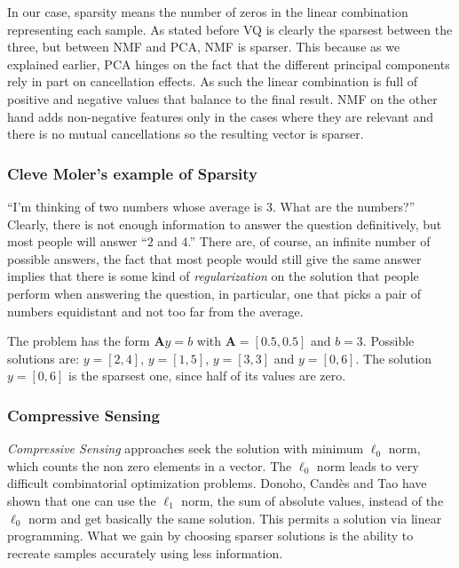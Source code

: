 \documentclass[a4paper]{article}
\begin{document}
In our case, sparsity means the number of zeros in the linear combination representing each sample. As stated before VQ is clearly the sparsest between the three, but between NMF and PCA, NMF is sparser. This because as we explained earlier, PCA hinges on the fact that the different principal components rely in part on cancellation effects. As such the linear combination is full of positive and negative values that balance to the final result. NMF on the other hand adds non-negative features only in the cases where they are relevant and there is no mutual cancellations so the resulting vector is sparser. 

\subsubsection{Cleve Moler's example of Sparsity}
``I'm thinking of two numbers whose average is 3. What are the numbers?''  Clearly, there is not enough information to answer the question definitively, but most people will answer ``$2$ and $4$.'' There are, of course, an infinite number of possible answers, the fact that most people would still give the same answer implies that there is some kind of \textit{regularization} on the solution that people perform when answering the question, in particular, one that picks a pair of numbers equidistant and not too far from the average.

The problem has the form $\mathbf{A}y=b$ with $\mathbf{A}=[0.5,0.5]$ and $b=3$. Possible solutions are: $y=[2,4]$, $y=[1,5]$, $y=[3,3]$ and $y=[0,6]$. The solution $y=[0,6]$ is the sparsest one, since half of its values are zero.

\subsubsection{Compressive Sensing}
\textit{Compressive Sensing} approaches seek the solution with minimum $\ell_0$ norm, which counts the non zero elements in a vector. The $\ell_0$ norm leads to very difficult combinatorial optimization problems. Donoho, Cand\`{e}s and Tao have shown that one can use the $\ell_1$ norm, the sum of absolute values,  instead of the $\ell_0$ norm and get basically the same solution. This permits a solution via linear programming. What we gain by choosing sparser solutions is the ability to recreate samples accurately using less information.
\end{document}
